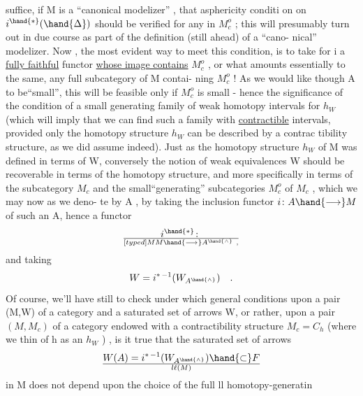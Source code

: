 
suffice,  if M is a ``canonical modelizer'' ,  that  asphericity conditi%
on on $i^{\hand{*}}(\hand{\Delta})$  should be verified for any \hand{$\Delta$} in $M_c^o$ ;  this will presumably
turn out in due course as part of the definition (still ahead) of a ``cano-%
nical'' modelizer.  Now ,  the most evident way to meet this condition,  is
to take for i a \uline{fully faithful} functor \uline{whose image contains} $M_c^o$ ,  or
what amounts essentially to the same,  any full subcategory of M contai-%
ning $M_c^o$ !  As we would like though A to be``small'',  this will be feasible
only if $M_c^o$ is small  -  hence the significance of the condition of a
small generating family of weak homotopy intervals for $h_W$ (which will
imply that we can find such a family with \uline{contractible} intervals,  
provided only  the homotopy structure $h_W$ can be described by a contrac%
tibility structure,  as we did assume indeed).  Just as the homotopy
structure $h_W$ of M was defined in terms of W,  conversely the notion of
weak equivalences W  should be recoverable in terms of the homotopy
structure,  and more specifically in terms of the subcategory $M_c$ and the
small``generating'' subcategories $M_c^o$ of $M_c$ ,  which we may now as we deno-%
te by A ,  by taking the inclusion functor $i\colon A\hand{\longrightarrow} M$ of such an A,  hence
a functor
\[ i^{\hand{*}}\colon \over[typed]{M}{M} \hand{\longrightarrow} A^{\hand{\wedge}} \ , \]
and taking
\[ W = i^{*\,-1}(W_{A^{\hand{\wedge}}}) \quad . \]
Of course, we'll have still to check under which general conditions upon
a pair (M,W) of a category and a saturated set of arrows W,  or rather,
upon a pair  $(M,M_c)$  of a category endowed with a contractibility
structure $M_c = C_h$  (where we thin of h as an $h_W$ ) ,  is it true that
the saturated set of arrows
\[ W(A) = i^{*\,-1}(W_{A^{\hand{\wedge}}}) \hand{\subset} F\over{l}{\ell}(M) \]
in M does not depend upon the choice of the full ll homotopy-generatin
